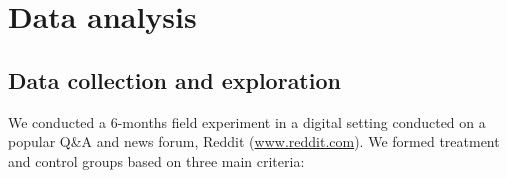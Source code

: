 \documentclass[preprint,12pt]{elsarticle}
\begin{document}














\section{Data analysis}\label{sec{analysis}}

\subsection{Data collection and exploration}\label{subsec:data-and-exploration}









We conducted a 6-months field experiment in a digital setting conducted on a popular Q\&A and news forum, Reddit (\url{www.reddit.com}). We formed treatment and control groups based on three main criteria:
\end{document}
